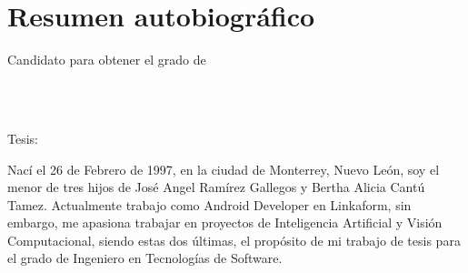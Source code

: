 
\chapter*{Resumen autobiográfico}
\thispagestyle{empty}

\begin{center}
\autor

Candidato para obtener el grado de\\
\grado\\
\orientacion\bigskip

\uanl\\
\fime\bigskip

Tesis:\\
\textsc{\large\titulo}
\end{center}\bigskip

Nací el 26 de Febrero de 1997, en la ciudad de Monterrey, Nuevo León, soy el menor de tres hijos de José Angel Ramírez Gallegos y Bertha Alicia Cantú Tamez. Actualmente trabajo como Android Developer en Linkaform, sin embargo, me apasiona trabajar en proyectos de Inteligencia Artificial y Visión Computacional, siendo estas dos últimas, el propósito de mi trabajo de tesis para el grado de Ingeniero en Tecnologías de Software.

